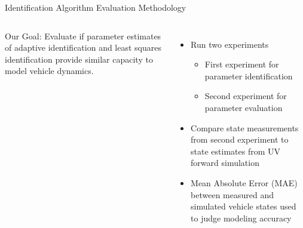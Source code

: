 

\begin{frame}{Identification Algorithm Evaluation Methodology}

\begin{columns}
      \alert<1-2>{Our Goal}: Evaluate if parameter estimates of
      adaptive identification and least squares identification
      \alert<2>{provide similar capacity to model vehicle dynamics}.

      \vskip10pt

      \begin{itemize}
      \item<3-> Run two experiments 
       \begin{itemize}
       \item<3-> First experiment for parameter identification
       \item<3-> Second experiment for parameter evaluation
       \end{itemize}
     \item<3-> Compare state measurements from second experiment 
               to state estimates from UV forward simulation
      \item<3-> Mean Absolute Error (MAE) between measured and
        simulated vehicle states used to judge modeling accuracy

      \end{itemize} 
    
  \end{columns} 

\end{frame}

